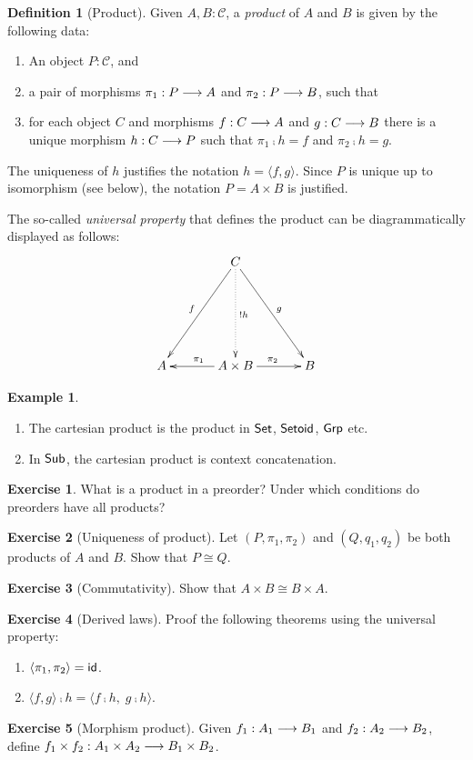 \documentclass[a4paper,fleqn]{scrartcl}
\theoremstyle{definition}
\newtheorem{definition}{Definition}
\newtheorem{example}{Example}
\newtheorem{exercise}{Exercise}
\newcommand{\C}{\mathcal{C}}
\begin{document}
\begin{definition}[Product]
  Given $A,B : \C$, a \emph{product} of $A$ and $B$ is given by the
  following data:
  \begin{enumerate}
  \item An object $P : \C$, and
  \item a pair of morphisms $\pi_1 : P \longrightarrow A$ and $\pi_2 : P \longrightarrow B$,
    such that
  \item for each object $C$ and morphisms $f : C \longrightarrow A$ and $g : C
    \longrightarrow B$ there is a unique morphism $h : C \longrightarrow P$ such that $\pi_1
    \comp h = f$ and $\pi_2 \comp h = g$.
  \end{enumerate}
  The uniqueness of $h$ justifies the notation $h = \langle f,g \rangle$.
  Since $P$ is unique up to isomorphism (see below),
  the notation $P = A \times B$
  is justified.
\end{definition}
The so-called \emph{universal property} that defines the product can
be diagrammatically displayed as follows:
\[
\xymatrix@C=8ex@R=16ex{
& \ar[dl]_f C \ar@{.>}[d]^{!h} \ar[dr]^g& \\
A & \ar[l]_{\pi_1} A \times B  \ar[r]^{\pi_2} & B \\
}
\]
\begin{example}\bla
  \begin{enumerate}
  \item The cartesian product is the product in $\mathsf{Set}$, $\mathsf{Setoid}$,
    $\mathsf{Grp}$ etc.
  \item In $\mathsf{Sub}$, the cartesian product is context concatenation.
  \end{enumerate}
\end{example}
\begin{exercise}
  What is a product in a preorder?
  Under which conditions do preorders have all products?
\end{exercise}
\begin{exercise}[Uniqueness of product]
  Let $(P,\pi_1,\pi_2)$ and $(Q,q_1,q_2)$ be both products of $A$ and
  $B$.  Show that $P \cong Q$.
\end{exercise}
\begin{exercise}[Commutativity]
  Show that $A \times B \cong B \times A$.
\end{exercise}
\begin{exercise}[Derived laws]
  Proof the following theorems using the universal property:
  \begin{enumerate}
  \item $\langle \pi_1,\pi_2 \rangle = \mathsf{id}$.
  \item $\langle f,g \rangle \comp h = \langle f \comp h,\; g \comp h \rangle$.
  \end{enumerate}
\end{exercise}
\begin{exercise}[Morphism product]
  Given $f_1 : A_1 \longrightarrow B_1$ and $f_2 : A_2 \longrightarrow B_2$, define $f_1
  \times f_2 : A_1 \times A_2 \longrightarrow B_1 \times B_2$.
\end{exercise}
\end{document}
